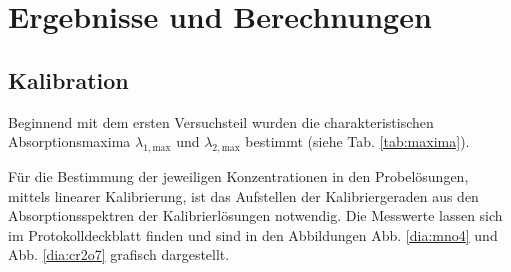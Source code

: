 \newpage
\section{Ergebnisse und Berechnungen}
\label{sec:ergebnisse}

\subsection{Kalibration}
Beginnend mit dem ersten Versuchsteil wurden die charakteristischen Absorptionsmaxima $\lambda_{1,\text{max}}$ und $\lambda_{2,\text{max}}$ bestimmt (siehe Tab. \ref{tab:maxima}).

\begin{table}[h!]
	\renewcommand*{\arraystretch}{1.2}
	\centering
	\caption{Absorptionsmaxima  vom Permanganat-Ion $\lambda_{1,\text{max}}$ und vom Dichromat-Ion $\lambda_{2,\text{max}}$ }
	\label{tab:maxima}
\end{table}%
\FloatBarrier

Für die Bestimmung der jeweiligen Konzentrationen in den Probelösungen, mittels linearer Kalibrierung, ist das Aufstellen der Kalibriergeraden aus den Absorptionsspektren der Kalibrierlösungen notwendig. Die Messwerte lassen sich im Protokolldeckblatt finden und sind in den Abbildungen Abb. \ref{dia:mno4} und Abb. \ref{dia:cr2o7} grafisch dargestellt.


